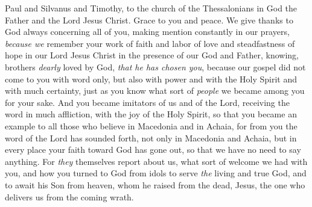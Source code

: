 
\begin{biblechapter} %
 Paul and Silvanus and Timothy, to the church of the Thessalonians in God the Father and the Lord Jesus Christ. Grace to you and peace.
 We give thanks to God always concerning all of you, making mention constantly in our prayers,
\verse \textit{because we} remember your work of faith and labor of love and steadfastness of hope in our Lord Jesus Christ in the presence of our God and Father,
\verse knowing, brothers \textit{dearly} loved by God, \textit{that he has chosen you},
\verse because our gospel did not come to you with word only, but also with power and with the Holy Spirit and with much certainty, just as you know what sort of \textit{people} we became among you for your sake.
\verse And you became imitators of us and of the Lord, receiving the word in much affliction, with the joy of the Holy Spirit,
\verse so that you became an example to all those who believe in Macedonia and in Achaia,
\verse for from you the word of the Lord has sounded forth, not only in Macedonia and Achaia, but in every place your faith toward God has gone out, so that we have no need to say anything.
\verse For \textit{they} themselves report about us, what sort of welcome we had with you, and how you turned to God from idols to serve \textit{the} living and true God,
\verse and to await his Son from heaven, whom he raised from the dead, Jesus, the one who delivers us from the coming wrath.
\end{biblechapter}

